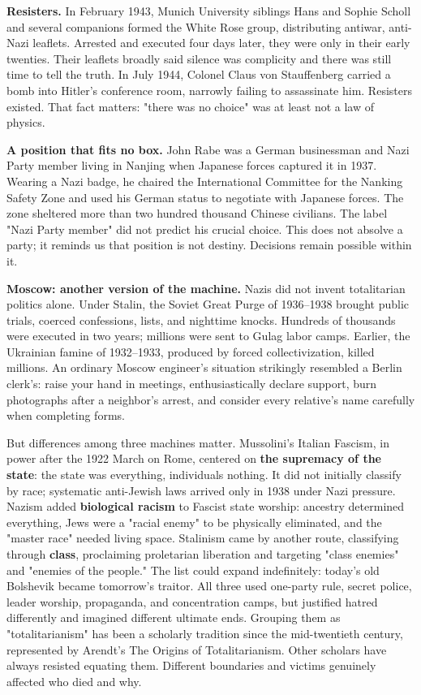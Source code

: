 \textbf{Resisters.} In February 1943, Munich University siblings Hans and Sophie Scholl and several companions formed the White Rose group, distributing antiwar, anti-Nazi leaflets. Arrested and executed four days later, they were only in their early twenties. Their leaflets broadly said silence was complicity and there was still time to tell the truth. In July 1944, Colonel Claus von Stauffenberg carried a bomb into Hitler's conference room, narrowly failing to assassinate him. Resisters existed. That fact matters: "there was no choice" was at least not a law of physics.

\textbf{A position that fits no box.} John Rabe was a German businessman and Nazi Party member living in Nanjing when Japanese forces captured it in 1937. Wearing a Nazi badge, he chaired the International Committee for the Nanking Safety Zone and used his German status to negotiate with Japanese forces. The zone sheltered more than two hundred thousand Chinese civilians. The label "Nazi Party member" did not predict his crucial choice. This does not absolve a party; it reminds us that position is not destiny. Decisions remain possible within it.

\textbf{Moscow: another version of the machine.} Nazis did not invent totalitarian politics alone. Under Stalin, the Soviet Great Purge of 1936--1938 brought public trials, coerced confessions, lists, and nighttime knocks. Hundreds of thousands were executed in two years; millions were sent to Gulag labor camps. Earlier, the Ukrainian famine of 1932--1933, produced by forced collectivization, killed millions. An ordinary Moscow engineer's situation strikingly resembled a Berlin clerk's: raise your hand in meetings, enthusiastically declare support, burn photographs after a neighbor's arrest, and consider every relative's name carefully when completing forms.

But differences among three machines matter. Mussolini's Italian Fascism, in power after the 1922 March on Rome, centered on \textbf{the supremacy of the state}: the state was everything, individuals nothing. It did not initially classify by race; systematic anti-Jewish laws arrived only in 1938 under Nazi pressure. Nazism added \textbf{biological racism} to Fascist state worship: ancestry determined everything, Jews were a "racial enemy" to be physically eliminated, and the "master race" needed living space. Stalinism came by another route, classifying through \textbf{class}, proclaiming proletarian liberation and targeting "class enemies" and "enemies of the people." The list could expand indefinitely: today's old Bolshevik became tomorrow's traitor. All three used one-party rule, secret police, leader worship, propaganda, and concentration camps, but justified hatred differently and imagined different ultimate ends. Grouping them as "totalitarianism" has been a scholarly tradition since the mid-twentieth century, represented by Arendt's The Origins of Totalitarianism. Other scholars have always resisted equating them. Different boundaries and victims genuinely affected who died and why.

